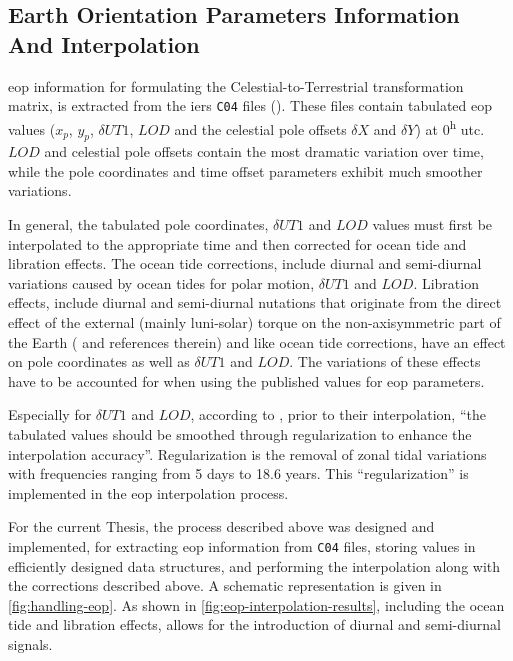 \subsection{Earth Orientation Parameters Information And Interpolation}\label{ssec:eop-interpolation}

\Gls{eop} information for formulating the Celestial-to-Terrestrial transformation 
matrix, is extracted from the \gls{iers} \texttt{C04} files (\cite{Bizouard2019}).
These files contain tabulated \gls{eop} values ($x_p$, $y_p$, $\delta UT1$, $LOD$ and 
the celestial pole offsets $\delta X$ and $\delta Y$) at 0\textsuperscript{h} \gls{utc}. 
$LOD$ and celestial pole offsets contain the most dramatic variation over time, while 
the pole coordinates and time offset parameters exhibit much smoother variations.

In general, the tabulated pole coordinates, $\delta UT1$ and $LOD$ values must first 
be interpolated to the appropriate time and then corrected for ocean tide and 
libration effects. The ocean tide corrections, include diurnal and semi-diurnal 
variations caused by ocean tides for polar motion, $\delta UT1$ and $LOD$. Libration effects, 
include diurnal and semi-diurnal nutations that originate from the direct effect 
of the external (mainly luni-solar) torque on the non-axisymmetric part of the Earth 
(\cite{iers2010} and references therein) and like ocean tide corrections, have an effect on 
pole coordinates as well as $\delta UT1$ and $LOD$. The variations of these effects 
have to be accounted for when using the published values for \gls{eop} parameters.

Especially for $\delta UT1$ and $LOD$, according to \cite{Bradley2016}, 
prior to their interpolation, ``the tabulated values should be smoothed through regularization 
to enhance the interpolation accuracy''. Regularization is the removal of zonal tidal 
variations with frequencies ranging from 5 days to 18.6 years. This ``regularization'' is 
implemented in the \gls{eop} interpolation process.

For the current Thesis, the process described above was designed and implemented, for 
extracting \gls{eop} information from \texttt{C04} files, storing values in efficiently designed 
data structures, and performing the interpolation along with the corrections described above.
A schematic representation is given in \autoref{fig:handling-eop}. As shown in 
\autoref{fig:eop-interpolation-results}, including the ocean tide and libration 
effects, allows for the introduction of diurnal and semi-diurnal signals.

